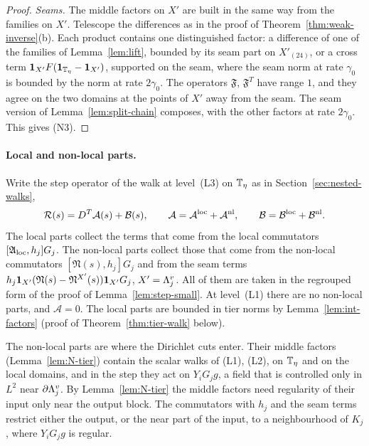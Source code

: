 \begin{proof}
\emph{Seams.} The middle factors on $X'$ are built in the same way from the families on $X'$. Telescope the differences as in the proof of Theorem~\ref{thm:weak-inverse}(b). Each product contains one distinguished factor: a difference of one of the families of Lemma~\ref{lem:lift}, bounded by its seam part on $X'_{(24)}$, or a cross term $\mathbf 1_{X'}F(\mathbf 1_{\mathbb T_\eta}-\mathbf 1_{X'})$, supported on the seam, where the seam norm at rate $\gamma_0$ is bounded by the norm at rate $2\gamma_0$. The operators $\mathfrak F$, $\mathfrak F^T$ have range $1$, and they agree on the two domains at the points of $X'$ away from the seam. The seam version of Lemma~\ref{lem:split-chain} composes, with the other factors at rate $2\gamma_0$. This gives (N3).
\end{proof}

\paragraph{Local and non-local parts.} Write the step operator of the walk at level~(L3) on $\mathbb T_\eta$ as in Section~\ref{sec:nested-walks},
\[
\mathcal R(s)=D^T\mathcal A(s)+\mathcal B(s),\qquad\mathcal A=\mathcal A^{\rm loc}+\mathcal A^{\rm nl},\qquad\mathcal B=\mathcal B^{\rm loc}+\mathcal B^{\rm nl}.
\]
The local parts collect the terms that come from the local commutators $[\mathfrak A_{\rm loc},h_j]G_j$. The non-local parts collect those that come from the non-local commutators $[\mathfrak N(s),h_j]G_j$ and from the seam terms $h_j\mathbf 1_{X'}(\mathfrak N(s)-\mathfrak N^{X'}(s))\mathbf 1_{X'}G_j$, $X'=\Lambda^v_j$. All of them are taken in the regrouped form of the proof of Lemma~\ref{lem:step-small}. At level~(L1) there are no non-local parts, and $\mathcal A=0$. The local parts are bounded in tier norms by Lemma~\ref{lem:int-factors} (proof of Theorem~\ref{thm:tier-walk} below).

The non-local parts are where the Dirichlet cuts enter. Their middle factors (Lemma~\ref{lem:N-tier}) contain the scalar walks of (L1), (L2), on $\mathbb T_\eta$ and on the local domains, and in the step they act on $Y_iG_jg$, a field that is controlled only in $L^2$ near $\partial\Lambda^v_j$. By Lemma~\ref{lem:N-tier} the middle factors need regularity of their input only near the output block. The commutators with $h_j$ and the seam terms restrict either the output, or the near part of the input, to a neighbourhood of $K_j$, where $Y_iG_jg$ is regular.

